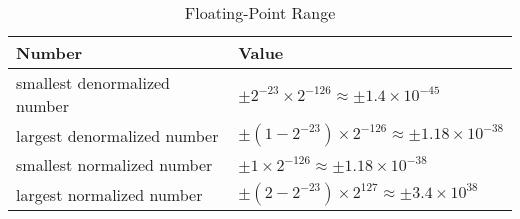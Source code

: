 \begin{table}[H]
\centering
\caption{Floating-Point Range}
\label{floating-point-range}
\begin{tabu} to \textwidth {XX}
\toprule
Number &Value\\
\hline
smallest denormalized number &$\pm 2^{-23} \times 2^{-126} \approx \pm 1.4 \times 10^{-45}$\\
\hline
largest denormalized number &$\pm (1-2^{-23}) \times 2^{-126} \approx \pm 1.18 \times 10^{-38}$\\
\hline
smallest normalized number &$\pm 1 \times 2^{-126} \approx \pm 1.18 \times 10^{-38}$\\
\hline
largest normalized number &$\pm (2-2^{-23}) \times 2^{127} \approx \pm 3.4 \times 10^{38}$\\
\bottomrule
\end{tabu}
\end{table}

